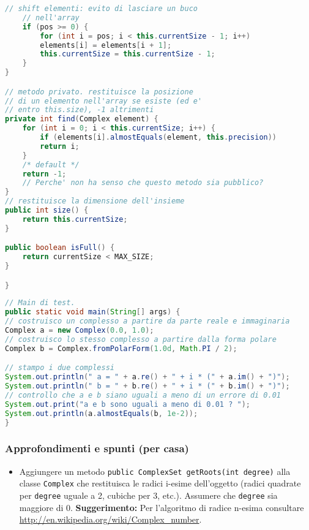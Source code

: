 \documentclass{article}
\begin{document}
\begin{lstlisting}[language=Java,escapechar=|]
	// shift elementi: evito di lasciare un buco
	// nell'array
	if (pos >= 0) {
		for (int i = pos; i < this.currentSize - 1; i++)
		elements[i] = elements[i + 1];
		this.currentSize = this.currentSize - 1;
	}
}

// metodo privato. restituisce la posizione
// di un elemento nell'array se esiste (ed e'
// entro this.size), -1 altrimenti
private int find(Complex element) {
	for (int i = 0; i < this.currentSize; i++) {
		if (elements[i].almostEquals(element, this.precision))
		return i;
	}
	/* default */
	return -1;
	// Perche' non ha senso che questo metodo sia pubblico?
}
// restituisce la dimensione dell'insieme
public int size() {
	return this.currentSize;
}

public boolean isFull() {
	return currentSize < MAX_SIZE;
}

}
\end{lstlisting}

\begin{lstlisting}[language=Java,escapechar=|]
// Main di test.
public static void main(String[] args) {
// costruisco un complesso a partire da parte reale e immaginaria
Complex a = new Complex(0.0, 1.0);
// costruisco lo stesso complesso a partire dalla forma polare
Complex b = Complex.fromPolarForm(1.0d, Math.PI / 2);

// stampo i due complessi
System.out.println(" a = " + a.re() + " + i * (" + a.im() + ")");
System.out.println(" b = " + b.re() + " + i * (" + b.im() + ")");
// controllo che a e b siano uguali a meno di un errore di 0.01
System.out.print("a e b sono uguali a meno di 0.01 ? ");
System.out.println(a.almostEquals(b, 1e-2));
}

\end{lstlisting}

\subsubsection{Approfondimenti e spunti (per casa)}
\begin{itemize}
	\item Aggiungere un metodo \texttt{public ComplexSet getRoots(int degree)} alla classe \texttt{Complex}
	che restituisca le radici i-esime dell'oggetto (radici quadrate per \texttt{degree} uguale a 2, cubiche per 3, etc.).
	Assumere che \texttt{degree} sia maggiore di 0.
	\textbf{Suggerimento:} Per l'algoritmo di radice n-esima consultare \url{http://en.wikipedia.org/wiki/Complex_number}.
\end{itemize}
\end{document}

